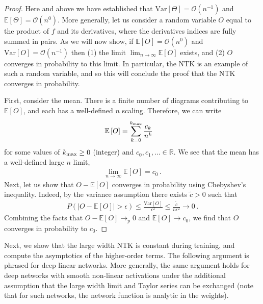 \documentclass[english]{article}
\newcommand{\bR}{\ensuremath{\mathbb{R}}}
\newcommand{\cO}{\ensuremath{\mathcal{O}}}
\newcommand{\lexp}{\mathbb{E}\left[}
\newcommand{\rexp}{\right]}
\begin{document}
\begin{proof}
Here and above we have established that $\mathrm{Var}[\Theta] = \cO(n^{-1})$ and $\lexp \Theta \rexp = \cO(n^0)$.
More generally, let us consider a random variable $O$ equal to the product of $f$ and its derivatives, where the derivatives indices are fully summed in pairs.
As we will now show, if $\lexp O \rexp = \cO(n^0)$ and $\mathrm{Var}[O] = \cO(n^{-1})$ then (1) the limit $\lim_{n\to\infty} \lexp O \rexp$ exists, and (2) $O$ converges in probability to this limit.
In particular, the NTK is an example of such a random variable, and so this will conclude the proof that the NTK converges in probability.

First, consider the mean.
There is a finite number of diagrams contributing to $\lexp O \rexp$, and each has a well-defined $n$ scaling.
Therefore, we can write
\begin{align}
  \lexp O \rexp &= \sum_{k=0}^{k_{\rm max}} \frac{c_k}{n^k} 
\end{align}
for some values of $k_{\rm max} \ge 0$ (integer) and $c_0,c_1,\ldots \in \bR$.
We see that the mean has a well-defined large $n$ limit,
\begin{align}
  \lim_{n\to\infty} \lexp O \rexp = c_0 \,.
\end{align}
Next, let us show that $O - \lexp O \rexp$ converges in probability using Chebyshev's inequality.
Indeed, by the variance assumption there exists $\tilde{c} > 0$ such that
\begin{align}
  P(|O - \lexp O \rexp| > \epsilon) \le
  \frac{\mathrm{Var} [O]}{\epsilon^2} \le
  \frac{\tilde{c}}{n \epsilon^2} \to 0 \,.
\end{align}
Combining the facts that $O - \lexp O \rexp \to_p 0$ and $\lexp O \rexp \to c_0$, we find that $O$ converges in probability to $c_0$.
\end{proof}

Next, we show that the large width NTK is constant during training, and compute the asymptotics of the higher-order terms.
The following argument is phrased for deep linear networks.
More generally, the same argument holds for deep networks with smooth non-linear activations under the additional assumption that the large width limit and Taylor series can be exchanged (note that for such networks, the network function is analytic in the weights).
\end{document}
